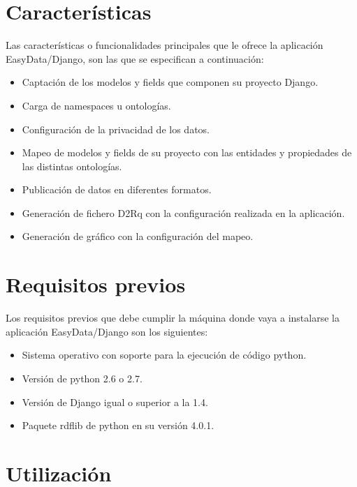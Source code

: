 \section{Características}
\label{sec:caracteristicas}
Las características o funcionalidades principales que le ofrece la aplicación
EasyData/Django, son las que se especifican a continuación:
\begin{itemize}
    \item Captación de los modelos y fields que componen su proyecto Django.
    \item Carga de namespaces u ontologías.
    \item Configuración de la privacidad de los datos.
    \item Mapeo de modelos y fields de su proyecto con las entidades y
          propiedades de las distintas ontologías.
    \item Publicación de datos en diferentes formatos.
    \item Generación de fichero D2Rq con la configuración realizada en la
          aplicación.
    \item Generación de gráfico con la configuración del mapeo.
\end{itemize}


\section{Requisitos previos}

Los requisitos previos que debe cumplir la máquina donde vaya a instalarse la
aplicación EasyData/Django son los siguientes:
\begin{itemize}
    \item Sistema operativo con soporte para la ejecución de código python.
    \item Versión de python 2.6 o 2.7.
    \item Versión de Django igual o superior a la 1.4.
    \item Paquete rdflib de python en su versión 4.0.1.
\end{itemize}


\section{Utilización}


